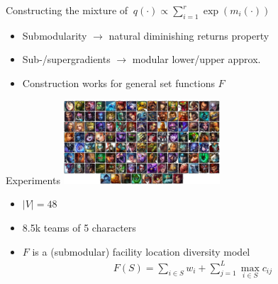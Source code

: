 \documentclass[mathserif]{beamer}
\begin{document}
\begin{frame}{Constructing the mixture}
\vspace{0.5em}
 of $\ q(\cdot) \propto \sum_{i = 1}^{r} \exp\left(m_i(\cdot) \right)$


\vspace{2em}
\begin{itemize}
\item<4-> Submodularity $\rightarrow$ natural diminishing returns property
\item<5-> Sub-/supergradients $\rightarrow$ modular lower/upper approx. 
\item<6-> Construction works for general set functions $F$
\end{itemize}
\end{frame}


\begin{frame}{Experiments}
\vspace{1em}
\centering
\includegraphics[width=2.3in]{figures/lol_champs.png}

\vspace{1em}
\begin{itemize}
\item<2-> $|V| = 48$
\vspace{0.5em}
\item<3-> 8.5k teams of 5 characters
\vspace{0.5em}
\item<4-> $F$ is a (submodular) facility location diversity model 
\begin{align*}
F(S) = \sum_{i \in S} w_i + \sum_{j=1}^L \max_{i \in S}c_{ij}
\end{align*}
\end{itemize}
\end{frame}
\end{document}
